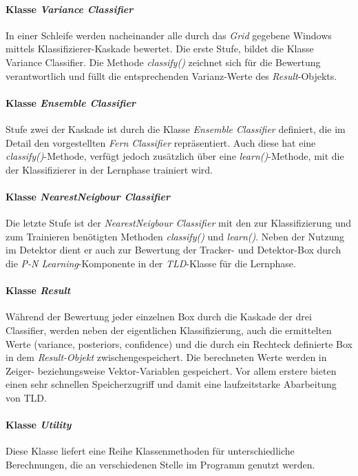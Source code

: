 \paragraph{Klasse \textit{Variance Classifier}}
In einer Schleife werden nacheinander alle durch das \textit{Grid} gegebene Windows mittels Klassifizierer-Kaskade bewertet. Die erste Stufe, bildet die Klasse Variance Classifier. Die Methode \textit{classify()} zeichnet sich für die Bewertung verantwortlich und füllt die entsprechenden Varianz-Werte des \textit{Result}-Objekts.

\paragraph{Klasse \textit{Ensemble Classifier}}
Stufe zwei der Kaskade ist durch die Klasse \textit{Ensemble Classifier} definiert, die im Detail den vorgestellten \textit{Fern Classifier} repräsentiert. Auch diese hat eine \textit{classify()}-Methode, verfügt jedoch zusätzlich über eine \textit{learn()}-Methode, mit die der Klassifizierer in der Lernphase trainiert wird.

\paragraph{Klasse \textit{NearestNeigbour Classifier}}
Die letzte Stufe ist der \textit{NearestNeigbour Classifier} mit den zur Klassifizierung und zum Trainieren benötigten Methoden \textit{classify()} und \textit{learn()}. Neben der Nutzung im Detektor dient er auch zur Bewertung der Tracker- und Detektor-Box durch die \textit{P-N Learning}-Komponente in der \textit{TLD}-Klasse für die Lernphase.

\paragraph{Klasse \textit{Result}}
Während der Bewertung jeder einzelnen Box durch die Kaskade der drei Classifier, werden neben der eigentlichen Klassifizierung, auch die ermittelten Werte (variance, posteriors, confidence) und die durch ein Rechteck definierte Box in dem \textit{Result-Objekt} zwischengespeichert. Die berechneten Werte werden in Zeiger- beziehungsweise Vektor-Variablen gespeichert. Vor allem erstere bieten einen sehr schnellen Speicherzugriff und damit eine laufzeitstarke Abarbeitung von TLD.

\paragraph{Klasse \textit{Utility}}
Diese Klasse liefert eine Reihe Klassenmethoden für unterschiedliche Berechnungen, die an verschiedenen Stelle im Programm genutzt werden.


